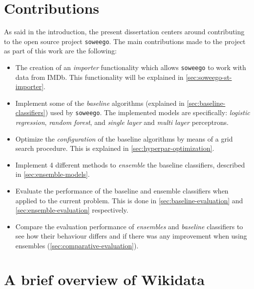 \documentclass[epsfig,a4paper,11pt,titlepage,twoside,openany]{book}
\newcommand{\soweego}[0]{\texttt{soweego}\xspace}
\begin{document}
\section{Contributions}
\label{sec:contributions}

As said in the introduction, the present dissertation centers around contributing to the open source project \soweego. The  main contributions made to the project as part of this work are the following:

\begin{itemize}
    \item The creation of an \textit{importer} functionality which allows \soweego to work with data from IMDb. This functionality will be explained in \autoref{sec:soweego-st-importer}.
    
    \item Implement some of the \textit{baseline} algorithms (explained in \autoref{sec:baseline-classifiers}) used by \soweego. The implemented models are specifically: \textit{logistic regression}, \textit{random forest}, and \textit{single layer} and \textit{multi layer} perceptrons.
    
    \item Optimize the \textit{configuration} of the baseline algorithms by means of a grid search procedure. This is explained in \autoref{sec:hyperpar-optimization}.
    
    \item Implement 4 different methods to \textit{ensemble} the baseline classifiers, described in \autoref{sec:ensemble-models}. 
    
    \item Evaluate the performance of the baseline and ensemble classifiers when applied to the current problem. This is done in \autoref{sec:baseline-evaluation} and \autoref{sec:ensemble-evaluation} respectively.
    
    \item Compare the evaluation performance of \textit{ensembles} and \textit{baseline} classifiers to see how their behaviour differs and if there was any improvement when using ensembles (\autoref{sec:comparative-evaluation}).
    
\end{itemize}




\section{A brief overview of Wikidata}
\label{sec:intro-wikidata}
\end{document}
